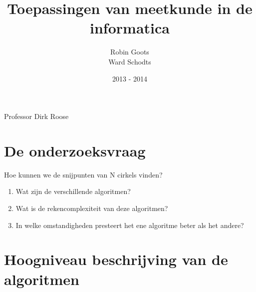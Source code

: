 \documentclass[11pt,a4paper]{article}
\begin{document}
\begin{titlepage}

\title{\Huge Toepassingen van meetkunde in de informatica}

\author{Robin Goots\\
Ward Schodts\\
}

\date{2013 - 2014}
\maketitle
\thispagestyle{empty}


\begin{center}
\Large Professor Dirk Roose
\vfill
\end{center}
\end{titlepage}
\section{De onderzoeksvraag}
Hoe kunnen we de snijpunten van N cirkels vinden?
\begin{enumerate}
\item Wat zijn de verschillende algoritmen?
\item Wat is de rekencomplexiteit van deze algoritmen?
\item In welke omstandigheden presteert het ene algoritme beter als het andere?
\end{enumerate}
\section{Hoogniveau beschrijving van de algoritmen}
\end{document}
